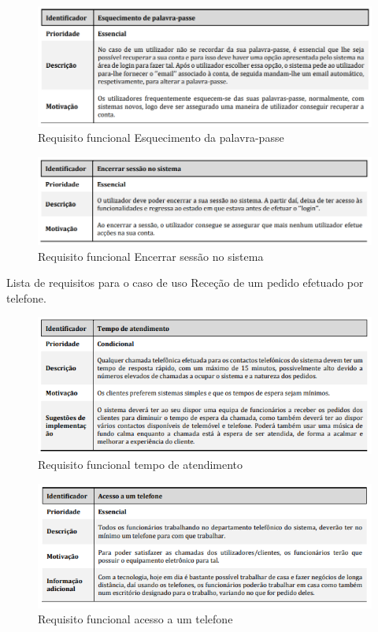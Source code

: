 \begin{figure}[H]
	\centering
	\includegraphics[width=15cm]{requisito_funcional3}
	\caption{Requisito funcional Esquecimento da palavra-passe}
	\label{fig:requisitofuncional3}
\end{figure}

\begin{figure}[H]
	\centering
	\includegraphics[width=15cm]{requisito_funcional4}
	\caption{Requisito funcional Encerrar sessão no sistema}
	\label{fig:requisitofuncional4}
\end{figure}

Lista de requisitos para o caso de uso Receção de um pedido efetuado por telefone.\\

\begin{figure}[H]
	\centering
	\includegraphics[width=15cm]{requisitofuncional5}
	\caption{Requisito funcional tempo de atendimento}
	\label{fig:requisitofuncional5}
\end{figure}

\begin{figure}[H]
	\centering
	\includegraphics[width=15cm]{requisitofuncional6}
	\caption{Requisito funcional acesso a um telefone}
	\label{fig:requisitofuncional6}
\end{figure}




